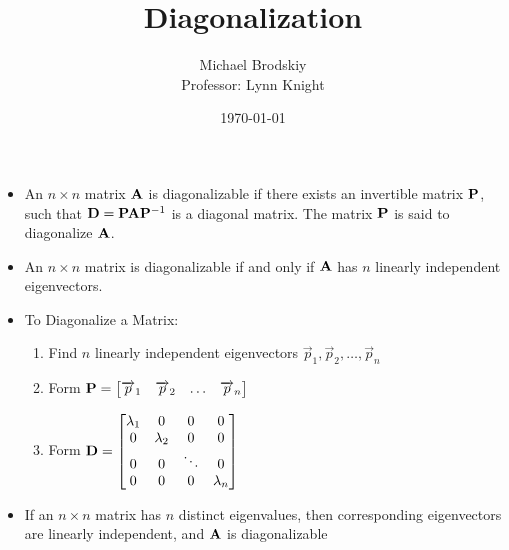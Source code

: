 \documentclass[12pt]{article}
\title{Diagonalization}
\date{\today}
\author{Michael Brodskiy\\ \small Professor: Lynn Knight}
\begin{document}
\maketitle

\begin{itemize}

  \item An $n\times n$ matrix $\bold{A}$ is diagonalizable if there exists an invertible matrix $\bold{P}$, such that $\bold{D}=\bold{P}\bold{A}\bold{P}^{-1}$ is a diagonal matrix. The matrix $\bold{P}$ is said to diagonalize $\bold{A}$.

  \item An $n\times n$ matrix is diagonalizable if and only if $\bold{A}$ has $n$ linearly independent eigenvectors.

  \item To Diagonalize a Matrix:

    \begin{enumerate}

      \item Find $n$ linearly independent eigenvectors $\overrightarrow{p}_1,\overrightarrow{p}_2,\dots,\overrightarrow{p}_n$

      \item Form $\bold{P}=\begin{bmatrix} \overrightarrow{p}_1 & \overrightarrow{p}_2 & \dots & \overrightarrow{p}_n\end{bmatrix}$

      \item Form $\bold{D}=\begin{bmatrix} \lambda_1 & 0 & 0 & 0\\ 0 & \lambda_2 & 0 & 0\\ 0 & 0 & \ddots & 0\\ 0 & 0 & 0 & \lambda_n \end{bmatrix}$

    \end{enumerate}

  \item If an $n\times n$ matrix has $n$ distinct eigenvalues, then corresponding eigenvectors are linearly independent, and $\bold{A}$ is diagonalizable

\end{itemize}
\end{document}
